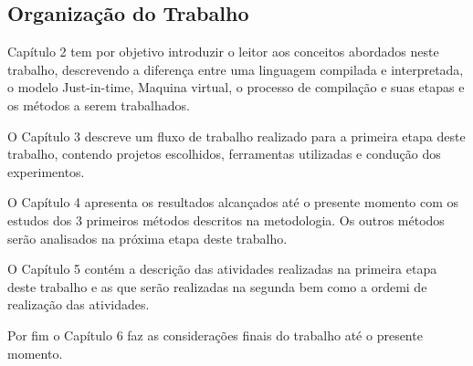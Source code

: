 \subsection{Organização do Trabalho}

Capítulo 2 tem por objetivo introduzir o leitor aos conceitos abordados
 neste trabalho, descrevendo a diferença entre uma linguagem compilada e
 interpretada, o modelo Just-in-time, Maquina virtual, o processo de compilação
 e suas etapas e os métodos a serem trabalhados.

O Capítulo 3 descreve um fluxo de trabalho realizado para a primeira etapa
 deste trabalho, contendo projetos escolhidos, ferramentas utilizadas e
 condução dos experimentos.

O Capítulo 4 apresenta os resultados alcançados até o presente momento com
 os estudos dos 3 primeiros métodos descritos na metodologia. Os outros
 métodos serão analisados na próxima etapa deste trabalho.

O Capítulo 5 contém a descrição das atividades realizadas na primeira
 etapa deste trabalho e as que serão realizadas na segunda bem como a ordemi
 de realização das atividades.

Por fim o Capítulo 6  faz as considerações finais do trabalho até o presente
 momento.



